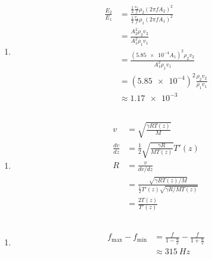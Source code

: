 \documentclass{article}
\begin{document}
\begin{enumerate}
  \item

        \begin{align*}
          \frac{E_2}{E_1} & = \frac{\frac{1}{2} \frac{v_2}{f} \rho_2 (2 \pi f A_2)^2}{\frac{1}{2} \frac{v_1}{f} \rho_1 (2 \pi f A_1)^2} \\
                          & = \frac{A_2^2 \rho_2 v_2}{A_1^2 \rho_1 v_1}                                                                 \\
                          & = \frac{(\num{5.85e-4} A_1)^2 \rho_2 v_2}{A_1^2 \rho_1 v_1}                                                 \\
                          & = (\num{5.85e-4})^2 \frac{\rho_2 v_2}{\rho_1 v_1}                                                           \\
                          & \approx \num{1.17e-3}
        \end{align*}
\end{enumerate}

\setcounter{subsection}{6}
\subsection{}

\begin{enumerate}
  \item

        \begin{align*}
          v               & = \sqrt{\frac{\gamma R T(z)}{M}}                                              \\
          \frac{d v}{d z} & = \frac{1}{2} \sqrt{\frac{\gamma R}{M T(z)}} T'(z)                            \\
          R               & = \frac{v}{d v / d z}                                                         \\
                          & = \frac{\sqrt{\gamma R T(z) / M}}{\frac{1}{2} T'(z) \sqrt{\gamma R / M T(z)}} \\
                          & = \frac{2 T(z)}{T'(z)}
        \end{align*}
\end{enumerate}

\subsection{}

\begin{enumerate}
  \item

        \begin{align*}
          f_\text{max} - f_\text{min} & = \frac{f}{1 - \frac{u}{v}} - \frac{f}{1 + \frac{u}{v}} \\
                                      & \approx \qty{315}{Hz}
        \end{align*}
\end{enumerate}
\end{document}
